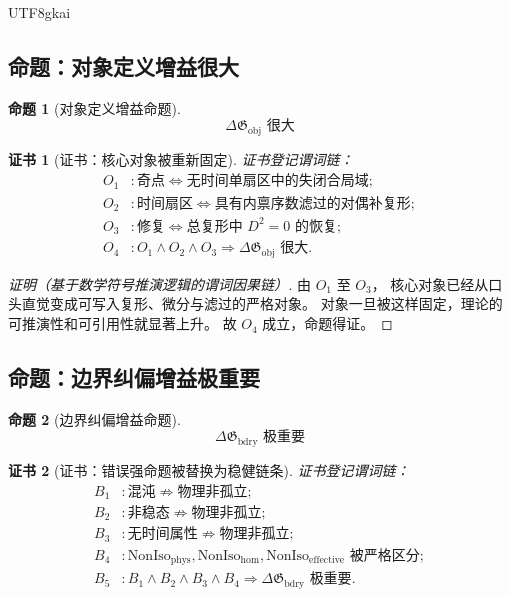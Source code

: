 \documentclass[12pt]{article}
\newtheorem{proposition}{命题}[section]
\newtheorem{Certificate}{证书}[section]
\begin{document}
\begin{CJK*}{UTF8}{gkai}
\subsection{命题：对象定义增益很大}
\label{subsec:tex43-ch11-proposition-obj}

\begin{proposition}[对象定义增益命题]
\label{prop:tex43-gain-obj}
\[
  \boxed{
    \Delta \mathfrak G_{\mathrm{obj}} \text{ 很大}
  }
\]
\end{proposition}

\begin{Certificate}[证书：核心对象被重新固定]
\label{cert:tex43-gain-obj}
证书登记谓词链：
\[
\begin{aligned}
  O_1 &: \text{奇点}
         \iff
         \text{无时间单扇区中的失闭合局域};\\
  O_2 &: \text{时间扇区}
         \iff
         \text{具有内禀序数滤过的对偶补复形};\\
  O_3 &: \text{修复}
         \iff
         \text{总复形中 }D^2=0\text{ 的恢复};\\
  O_4 &: O_1\wedge O_2\wedge O_3
         \Rightarrow
         \Delta \mathfrak G_{\mathrm{obj}} \text{ 很大}.
\end{aligned}
\]
\end{Certificate}

\begin{proof}[证明（基于数学符号推演逻辑的谓词因果链）]
由 $O_1$ 至 $O_3$，
核心对象已经从口头直觉变成可写入复形、微分与滤过的严格对象。
对象一旦被这样固定，理论的可推演性和可引用性就显著上升。
故 $O_4$ 成立，命题得证。
\end{proof}

\subsection{命题：边界纠偏增益极重要}
\label{subsec:tex43-ch11-proposition-bdry}

\begin{proposition}[边界纠偏增益命题]
\label{prop:tex43-gain-bdry}
\[
  \boxed{
    \Delta \mathfrak G_{\mathrm{bdry}} \text{ 极重要}
  }
\]
\end{proposition}

\begin{Certificate}[证书：错误强命题被替换为稳健链条]
\label{cert:tex43-gain-bdry}
证书登记谓词链：
\[
\begin{aligned}
  B_1 &: \text{混沌}\not\Rightarrow \text{物理非孤立};\\
  B_2 &: \text{非稳态}\not\Rightarrow \text{物理非孤立};\\
  B_3 &: \text{无时间属性}\not\Rightarrow \text{物理非孤立};\\
  B_4 &: \mathrm{NonIso}_{\mathrm{phys}},
         \mathrm{NonIso}_{\mathrm{hom}},
         \mathrm{NonIso}_{\mathrm{effective}}
         \text{ 被严格区分};\\
  B_5 &: B_1\wedge B_2\wedge B_3\wedge B_4
         \Rightarrow
         \Delta \mathfrak G_{\mathrm{bdry}} \text{ 极重要}.
\end{aligned}
\]
\end{Certificate}


\end{CJK*}
\end{document}
